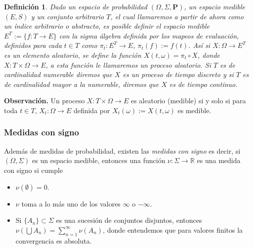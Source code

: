 \documentclass[letterpaper]{article}
\newtheorem{def.}{Definici\'on}[section]
\newcommand{\prob}{\textbf{P}}
\newcommand{\obs}{{\newline \noindent \sc \textbf{Observación. }}}
\newcommand{\om}{\ensuremath{\Omega}}
\newcommand{\sig}{\ensuremath{\Sigma}}
\newcommand{\re}{\ensuremath{\mathbb R }}
\begin{document}
\begin{def.}
Dado un espacio de probabilidad \((\om,\sig,\prob)\), un espacio medible \((E,S)\) y un conjunto arbitrario \(T\), el cual llamaremos a partir de ahora como un \emph{índice arbitrario o abstracto}, es posible definir el espacio medible \(E^{T}:=\{f:T\rightarrow E\}\) con la sigma álgebra definida por los mapeos de evaluación, definidos para cada \(t\in T\) como \(\pi_t:E^{T}\rightarrow E\), \(\pi_t(f):=f(t)\). Así si \(X:\om\rightarrow E^{T}\) es un elemento aleatorio, se define la función \(X(t,\omega)=\pi_t\circ X\), donde \(X:T\times\om\rightarrow E\), a esta función le llamaremos un \emph{proceso aleatorio}. Si \(T\) es de cardinalidad numerable diremos que \(X\) es un proceso de tiempo discreto y si \(T\) es de cardinalidad mayor a la numerable, diremos que \(X\) es de tiempo continuo.
\end{def.}
\obs Un proceso \(X:T\times\om\rightarrow E\) es aleatorio (medible) si y solo si para toda \(t\in T\), \(X_t:\om\rightarrow E\) definida por \(X_t(\omega):=X(t,\omega)\) es medible.

\subsubsection{Medidas con signo}
\label{sec:org533d4fc}

Además de medidas de probabilidad, existen las \emph{medidas con signo} es decir, si \((\Omega,\Sigma)\) es un espacio medible, entonces una función \(\nu:\Sigma\rightarrow\re\) es una medida con signo si cumple

\begin{itemize}
\item \(\nu(\emptyset)=0\).
\item \(\nu\) toma a lo más uno de los valores \(\infty\) o \(-\infty\).
\item Si \(\{A_n\}\subset\Sigma\) es una sucesión de conjuntos disjuntos, entonces \(\nu(\bigcup A_n)=\sum_{n=1}^{\infty} \nu(A_n)\), donde entendemos que para valores finitos la convergencia es absoluta.
\end{itemize}
\end{document}

